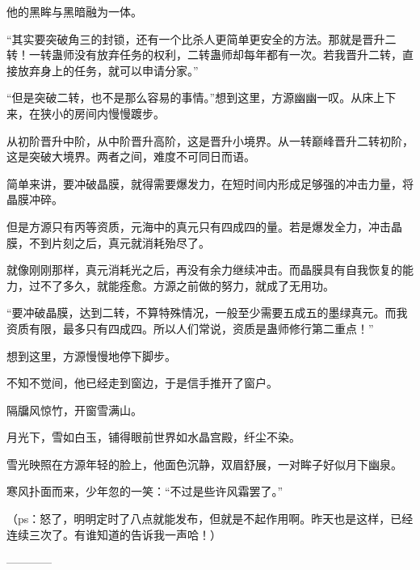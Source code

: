 \begin{this_body}
他的黑眸与黑暗融为一体。

“其实要突破角三的封锁，还有一个比杀人更简单更安全的方法。那就是晋升二转！一转蛊师没有放弃任务的权利，二转蛊师却每年都有一次。若我晋升二转，直接放弃身上的任务，就可以申请分家。”

“但是突破二转，也不是那么容易的事情。”想到这里，方源幽幽一叹。从床上下来，在狭小的房间内慢慢踱步。

从初阶晋升中阶，从中阶晋升高阶，这是晋升小境界。从一转巅峰晋升二转初阶，这是突破大境界。两者之间，难度不可同日而语。

简单来讲，要冲破晶膜，就得需要爆发力，在短时间内形成足够强的冲击力量，将晶膜冲碎。

但是方源只有丙等资质，元海中的真元只有四成四的量。若是爆发全力，冲击晶膜，不到片刻之后，真元就消耗殆尽了。

就像刚刚那样，真元消耗光之后，再没有余力继续冲击。而晶膜具有自我恢复的能力，过不了多久，就能痊愈。方源之前做的努力，就成了无用功。

“要冲破晶膜，达到二转，不算特殊情况，一般至少需要五成五的墨绿真元。而我资质有限，最多只有四成四。所以人们常说，资质是蛊师修行第二重点！”

想到这里，方源慢慢地停下脚步。

不知不觉间，他已经走到窗边，于是信手推开了窗户。

隔牖风惊竹，开窗雪满山。

月光下，雪如白玉，铺得眼前世界如水晶宫殿，纤尘不染。

雪光映照在方源年轻的脸上，他面色沉静，双眉舒展，一对眸子好似月下幽泉。

寒风扑面而来，少年忽的一笑：“不过是些许风霜罢了。”

（ps：怒了，明明定时了八点就能发布，但就是不起作用啊。昨天也是这样，已经连续三次了。有谁知道的告诉我一声哈！）

------------

\end{this_body}

